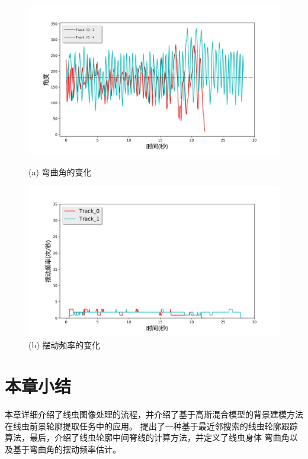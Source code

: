\begin{figure}[!htp]    
\begin{minipage}[t]{0.5\linewidth}%
	\centering    
	\includegraphics[width=1\linewidth]{figure/chap3/angle.jpg}    
	\caption*{(a) 弯曲角的变化}%
	\label{fig:angle}    
\end{minipage}    
\begin{minipage}[t]{0.5\linewidth}%
	\centering    
	\includegraphics[width=1\linewidth]{figure/chap3/freq.jpg}    
	\caption*{(b) 摆动频率的变化}    
	\label{fig:freq}    
\end{minipage}    
\end{figure}


\section{本章小结}
	本章详细介绍了线虫图像处理的流程，并介绍了基于高斯混合模型的背景建模方法在线虫前景轮廓提取任务中的应用。
	提出了一种基于最近邻搜索的线虫轮廓跟踪算法，最后，介绍了线虫轮廓中间脊线的计算方法，并定义了线虫身体
	弯曲角以及基于弯曲角的摆动频率估计。

